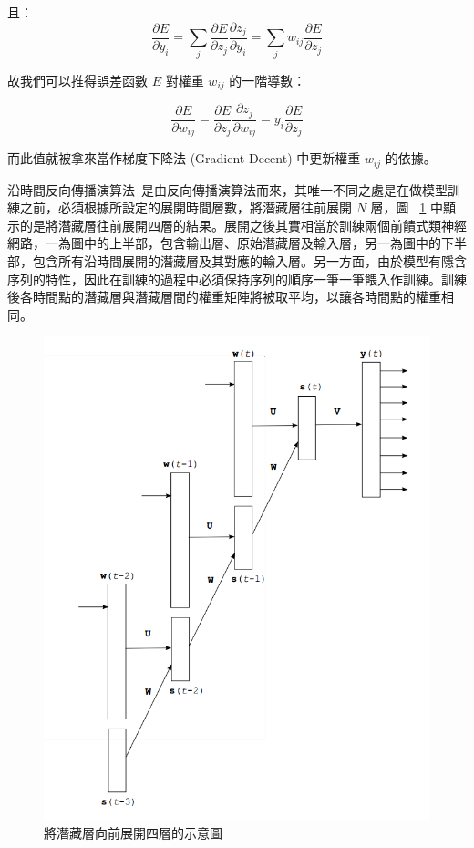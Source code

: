 且：
\begin{equation}
\frac{\partial E}{\partial y_i} = \sum_j \frac{\partial E}{\partial z_j} \frac{\partial z_j}{\partial y_i} = \sum_j w_{ij} \frac{\partial E}{\partial z_j}
\end{equation}

故我們可以推得誤差函數 $E$ 對權重 $w_{ij}$ 的一階導數：

\begin{equation}
\frac{\partial E}{\partial w_{ij}} = \frac{\partial E}{\partial z_j} \frac{\partial z_j}{\partial w_{ij}} = y_i \frac{\partial E}{\partial z_j} 
\end{equation}

而此值就被拿來當作梯度下降法 (Gradient Decent) 中更新權重 $w_{ij}$ 的依據。

沿時間反向傳播演算法~\cite{boden2002guide}是由反向傳播演算法而來，其唯一不同之處是在做模型訓練之前，必須根據所設定的展開時間層數，將潛藏層往前展開 $N$ 層，圖 ~\ref{fig:chap5_bptt}
中顯示的是將潛藏層往前展開四層的結果。展開之後其實相當於訓練兩個前饋式類神經網路，一為圖中的上半部，包含輸出層、原始潛藏層及輸入層，另一為圖中的下半部，包含所有沿時間展開的潛藏層及其對應的輸入層。另一方面，由於模型有隱含序列的特性，因此在訓練的過程中必須保持序列的順序一筆一筆餵入作訓練。訓練後各時間點的潛藏層與潛藏層間的權重矩陣將被取平均，以讓各時間點的權重相同。

\begin{figure}
\centering
\includegraphics[scale=0.3]{images/chap5_bptt.png}
\caption{將潛藏層向前展開四層的示意圖} \label{fig:chap5_bptt}
\end{figure}

